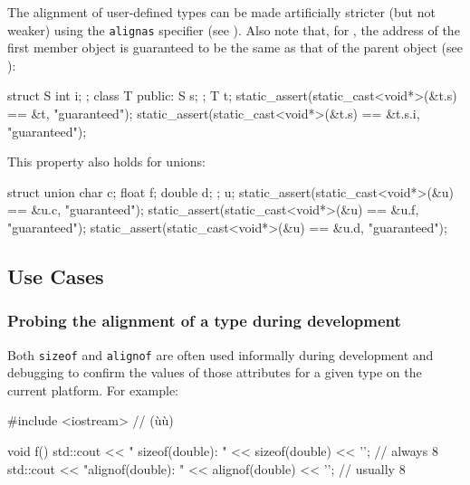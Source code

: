 \noindent The alignment of user-defined types can be made artificially stricter
  (but not weaker) using the \lstinline!alignas! specifier (see ).
  Also note that, for , the address of the
  first member object is guaranteed to be the same as that of the parent
  object (see ):

  \begin{emcppslisting}
struct S { int i; };                                                            
class T { public: S s; };                                                       
T t;                                                                            
static_assert(static_cast<void*>(&t.s) == &t, "guaranteed");                                                                             
static_assert(static_cast<void*>(&t.s) == &t.s.i, "guaranteed");
\end{emcppslisting}
      
\noindent This property also holds for unions:

\begin{emcppslisting}
struct { union { char c; float f; double d; }; } u;                             
static_assert(static_cast<void*>(&u) == &u.c, "guaranteed");          
static_assert(static_cast<void*>(&u) == &u.f, "guaranteed");          
static_assert(static_cast<void*>(&u) == &u.d, "guaranteed");
\end{emcppslisting}

    

\subsection[Use Cases]{Use Cases}\label{use-cases}

\subsubsection[Probing the alignment of a type during development]{Probing the alignment of a type during development}\label{probing-the-alignment-of-a-type-during-development}

Both \lstinline!sizeof! and \lstinline!alignof! are often used informally
during development and debugging to confirm the values
of those attributes for a given type on the current platform. For
example:

\begin{emcppslisting}
#include <iostream>  // (ù{}ù)

void f()
{
    std::cout << " sizeof(double): " <<  sizeof(double) << '\n';  //  always 8
    std::cout << "alignof(double): " << alignof(double) << '\n';  // usually 8
}
\end{emcppslisting}
    
